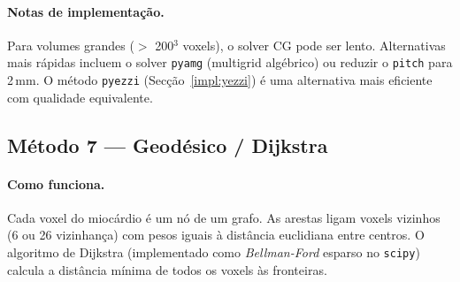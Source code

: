 \paragraph{Notas de implementação.}
Para volumes grandes ($>$ 200$^3$ voxels), o solver CG pode ser
lento. Alternativas mais rápidas incluem o solver
\texttt{pyamg} (multigrid algébrico) ou reduzir o
\texttt{pitch} para 2\,mm. O método \texttt{pyezzi}
(Secção~\ref{impl:yezzi}) é uma alternativa mais eficiente
com qualidade equivalente.

\subsection{Método 7 --- Geodésico / Dijkstra}
\label{impl:geodesic}

\paragraph{Como funciona.}
Cada voxel do miocárdio é um nó de um grafo. As arestas ligam
voxels vizinhos (6 ou 26 vizinhança) com pesos iguais à distância
euclidiana entre centros. O algoritmo de Dijkstra (implementado
como \emph{Bellman-Ford} esparso no \texttt{scipy}) calcula
a distância mínima de todos os voxels às fronteiras.

